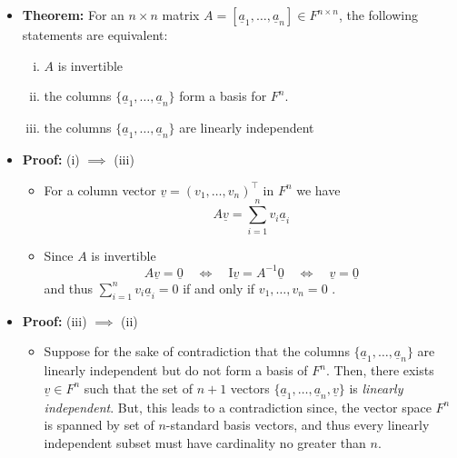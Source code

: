 \documentclass[11pt,twoside]{report}
\newcommand{\vecnot}{\underline}
\newcommand{\Id}{{\mathrm{I}}}
\begin{document}
\begin{itemize}

\item \textbf{Theorem:} For an $n \times n$ matrix $A = [ \vecnot{a}_1, \dots, \vecnot{a}_n] \in F^{n \times n}$, the following statements are equivalent:
\begin{enumerate}[(i)]
\item $A$ is invertible
\item the columns $\{\vecnot{a}_1, \dots, \vecnot{a}_n\}$ form a basis for $F^n$. 
\item the columns $\{\vecnot{a}_1, \dots, \vecnot{a}_n\}$ are linearly independent 
\end{enumerate}





\item \textbf{Proof:} (i) $\implies$ (iii)
\begin{itemize}
\item For a column vector $\vecnot{v}  =(v_1, \dots, v_n)^\top$ in $F^{n}$ we have
\[
A \vecnot{v} = \sum_{i=1}^n v_i \vecnot{a}_i
\]
\item Since $A$ is invertible
\[
A \vecnot{v} = \vecnot{0}  \quad \iff \quad \Id \vecnot{v}  = A^{-1} \vecnot{0}  \quad \iff \quad \vecnot{v}= \vecnot{0}
\]
and thus $\sum_{i=1}^n v_i \vecnot{a}_i = 0$ if and only if $v_1, \dots, v_n = 0$ .
\end{itemize}


\item \textbf{Proof:} (iii) $\implies$ (ii)
\begin{itemize}

\item Suppose for the sake of contradiction that the columns $\{\vecnot{a}_1, \dots, \vecnot{a}_n\}$ are linearly independent but do not form a basis of $F^n$. Then, there exists $\vecnot{v} \in F^n$ such that the set of $n+1$ vectors  $\{\vecnot{a}_1, \dots, \vecnot{a}_n, \vecnot{v}\}$ is \emph{linearly independent}. But, this leads to a contradiction since, the  vector space  $F^n$ is spanned by set of  $n$-standard basis vectors, and thus every linearly independent subset must have cardinality no greater than $n$. 


\end{itemize}
\end{itemize}
\end{document}
